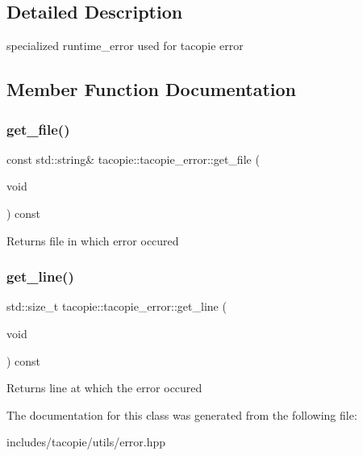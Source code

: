 \subsection{Detailed Description}
specialized runtime\+\_\+error used for tacopie error 

\subsection{Member Function Documentation}
\mbox{\label{classtacopie_1_1tacopie__error_a10360163c780a1bd9c95fcecca5aa6da}} 
\subsubsection{\texorpdfstring{get\+\_\+file()}{get\_file()}}
{\footnotesize\ttfamily const std\+::string\& tacopie\+::tacopie\+\_\+error\+::get\+\_\+file (\begin{DoxyParamCaption}\item[{void}]{ }\end{DoxyParamCaption}) const}

\begin{DoxyReturn}{Returns}
file in which error occured 
\end{DoxyReturn}
\mbox{\label{classtacopie_1_1tacopie__error_a39704d2cb6f076aa47d45f53f174b257}} 
\subsubsection{\texorpdfstring{get\+\_\+line()}{get\_line()}}
{\footnotesize\ttfamily std\+::size\+\_\+t tacopie\+::tacopie\+\_\+error\+::get\+\_\+line (\begin{DoxyParamCaption}\item[{void}]{ }\end{DoxyParamCaption}) const}

\begin{DoxyReturn}{Returns}
line at which the error occured 
\end{DoxyReturn}


The documentation for this class was generated from the following file\+:\begin{DoxyCompactItemize}
\item 
includes/tacopie/utils/error.\+hpp\end{DoxyCompactItemize}
